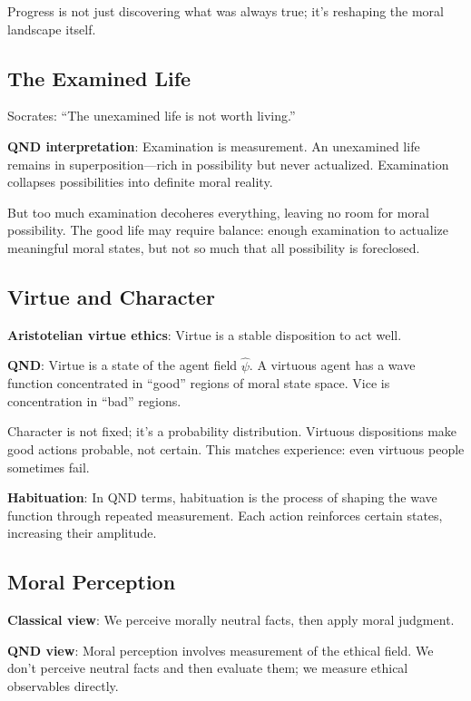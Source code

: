 \documentclass[12pt]{article}
\begin{document}
Progress is not just discovering what was always true; it's reshaping the moral landscape itself.

\subsection{The Examined Life}

Socrates: ``The unexamined life is not worth living.''

\textbf{QND interpretation}: Examination is measurement. An unexamined life remains in superposition---rich in possibility but never actualized. Examination collapses possibilities into definite moral reality.

But too much examination decoheres everything, leaving no room for moral possibility. The good life may require balance: enough examination to actualize meaningful moral states, but not so much that all possibility is foreclosed.

\subsection{Virtue and Character}

\textbf{Aristotelian virtue ethics}: Virtue is a stable disposition to act well.

\textbf{QND}: Virtue is a state of the agent field $\hat{\psi}$. A virtuous agent has a wave function concentrated in ``good'' regions of moral state space. Vice is concentration in ``bad'' regions.

Character is not fixed; it's a probability distribution. Virtuous dispositions make good actions probable, not certain. This matches experience: even virtuous people sometimes fail.

\textbf{Habituation}: In QND terms, habituation is the process of shaping the wave function through repeated measurement. Each action reinforces certain states, increasing their amplitude.

\subsection{Moral Perception}

\textbf{Classical view}: We perceive morally neutral facts, then apply moral judgment.

\textbf{QND view}: Moral perception involves measurement of the ethical field. We don't perceive neutral facts and then evaluate them; we measure ethical observables directly.
\end{document}
